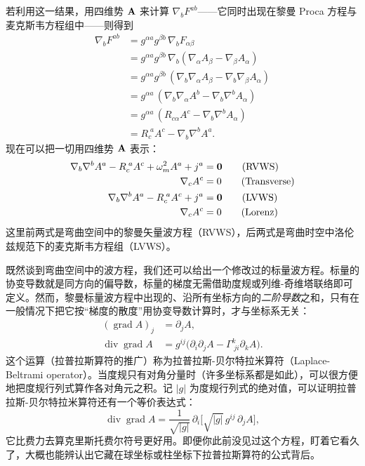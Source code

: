 若利用这一结果，用四维势 $\mathbf{A}$ 来计算 $\nabla_{b} F^{ab}$——它同时出现在黎曼 Proca 方程与麦克斯韦方程组中——则得到
\begin{align}
\nabla_{b} F^{ab} &= g^{\alpha a} g^{\beta b}\, \nabla_{b} F_{\alpha\beta} \nonumber\\
&= g^{\alpha a} g^{\beta b}\, \nabla_{b}(\nabla_{\alpha} A_{\beta} - \nabla_{\beta} A_{\alpha}) \nonumber\\
&= g^{\alpha a} g^{\beta b}\, (\nabla_{b}\nabla_{\alpha} A_{\beta} - \nabla_{b}\nabla_{\beta} A_{\alpha}) \nonumber\\
&= g^{\alpha a}\, (\nabla_{b}\nabla_{\alpha} A^{b} - \nabla_{b}\nabla^{b} A_{\alpha}) \nonumber\\
&= g^{\alpha a}\, (R_{c\alpha} A^{c} - \nabla_{b}\nabla^{b} A_{\alpha}) \nonumber\\
&= R_{c}^{\;a} A^{c} - \nabla_{b}\nabla^{b} A^{a}.
\end{align}
现在可以把一切用四维势 $\mathbf{A}$ 表示：
\begin{align}
\nabla_{b}\nabla^{b} A^{a} - R_{c}^{\;a} A^{c} + \omega_m^{2} A^{a} + j^{a} &= \mathbf{0} \tag{RVWS}\\
\nabla_{c} A^{c} &= 0 \tag{Transverse}\\
\nabla_{b}\nabla^{b} A^{a} - R_{c}^{\;a} A^{c} + j^{a} &= \mathbf{0} \tag{LVWS}\\
\nabla_{c} A^{c} &= 0 \tag{Lorenz}
\end{align}
这里前两式是弯曲空间中的黎曼矢量波方程（RVWS），后两式是弯曲时空中洛伦兹规范下的麦克斯韦方程组（LVWS）。

既然谈到弯曲空间中的波方程，我们还可以给出一个修改过的标量波方程。标量的协变导数就是同方向的偏导数，标量的梯度无需借助度规或列维-奇维塔联络即可定义。然而，黎曼标量波方程中出现的、沿所有坐标方向的\emph{二阶导数}之和，只有在一般情况下把它按“梯度的散度”用协变导数计算时，才与坐标系无关：
\begin{align}
(\operatorname{grad} A)_{j} &= \partial_{j} A,\\
\operatorname{div}\operatorname{grad} A &= g^{ij}\bigl(\partial_{i}\partial_{j} A - \Gamma^{k}_{\;ji}\partial_{k} A\bigr).
\end{align}
这个运算（拉普拉斯算符的推广）称为拉普拉斯-贝尔特拉米算符（Laplace-Beltrami operator）。当度规只有对角分量时（许多坐标系都是如此），可以很方便地把度规行列式算作各对角元之积。记 $|g|$ 为度规行列式的绝对值，可以证明拉普拉斯-贝尔特拉米算符还有一个等价表达式：
\begin{equation}
\operatorname{div}\operatorname{grad} A = \frac{1}{\sqrt{|g|}}\,\partial_{i}\bigl[\sqrt{|g|}\,g^{ij}\,\partial_{j} A\bigr],
\end{equation}
它比费力去算克里斯托费尔符号更好用。即便你此前没见过这个方程，盯着它看久了，大概也能辨认出它藏在球坐标或柱坐标下拉普拉斯算符的公式背后。

